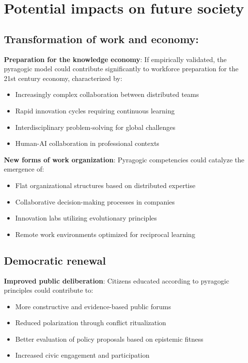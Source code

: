 \section{Potential impacts on future society}
\subsection*{Transformation of work and economy:}

\textbf{Preparation for the knowledge economy}:
If empirically validated, the pyragogic model could contribute significantly to workforce preparation for the 21st century economy, characterized by:
\begin{itemize}
	\item Increasingly complex collaboration between distributed teams
	\item Rapid innovation cycles requiring continuous learning
	\item Interdisciplinary problem-solving for global challenges
	\item Human-AI collaboration in professional contexts
\end{itemize}

\textbf{New forms of work organization}:
Pyragogic competencies could catalyze the emergence of:
\begin{itemize}
	\item Flat organizational structures based on distributed expertise
	\item Collaborative decision-making processes in companies
	\item Innovation labs utilizing evolutionary principles
	\item Remote work environments optimized for reciprocal learning
\end{itemize}

\subsection{Democratic renewal}

\textbf{Improved public deliberation}:
Citizens educated according to pyragogic principles could contribute to:
\begin{itemize}
	\item More constructive and evidence-based public forums
	\item Reduced polarization through conflict ritualization
	\item Better evaluation of policy proposals based on epistemic fitness
	\item Increased civic engagement and participation
\end{itemize}

